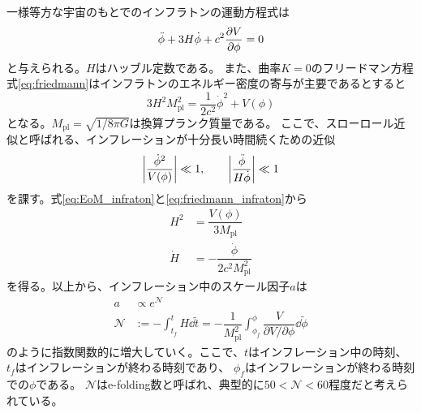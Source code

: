 \documentclass[../../main.tex]{subfiles}
\begin{document}
一様等方な宇宙のもとでのインフラトンの運動方程式は
\begin{equation}
    \label{eq:EoM_infraton}
    \ddot{\phi}+3H\dot{\phi}+c^2\pdv{V}{\phi} = 0
\end{equation}
と与えられる。$H$はハッブル定数である。
また、曲率$K=0$のフリードマン方程式\eqref{eq:friedmann}はインフラトンのエネルギー密度の寄与が主要であるとすると
\begin{equation}
    \label{eq:friedmann_infraton}
    3H^2M_{\mathrm{pl}}^2 = \dfrac{1}{2c^2}\dot{\phi}^2 +V(\phi)
\end{equation}
となる。$M_{\mathrm{pl}}=\sqrt{1/8\pi G}$は換算プランク質量である。
ここで、スローロール近似と呼ばれる、インフレーションが十分長い時間続くための近似
\begin{align}
    \qty|\dfrac{\dot{\phi}^2}{V(\phi)}| \ll 1,\qquad \qty|\dfrac{\ddot{\phi}}{H\dot{\phi}}| \ll 1
\end{align}
を課す。式\eqref{eq:EoM_infraton}と\eqref{eq:friedmann_infraton}から
\begin{align}
    H^2 &= \dfrac{V(\phi)}{3M_{\mathrm{pl}}} \\
    \dot{H} &= -\dfrac{\dot{\phi}}{2c^2M_{\mathrm{pl}}^2}
\end{align}
を得る。以上から、インフレーション中のスケール因子$a$は
\begin{align}
    a&\propto e^{\mathcal{N}} \\
    \mathcal{N} &:= -\int_{t_f}^{t}H\dd{\tilde{t}} = -\dfrac{1}{M_{\mathrm{pl}}^2}\int_{\phi_f}^{\phi}\dfrac{V}{\partial V/\partial \phi}\dd{\tilde{\phi}}
\end{align}
のように指数関数的に増大していく。ここで、$t$はインフレーション中の時刻、$t_f$はインフレーションが終わる時刻であり、
$\phi_f$はインフレーションが終わる時刻での$\phi$である。
$\mathcal{N}$はe-folding数と呼ばれ、典型的に$50<\mathcal{N}<60$程度だと考えられている。
\end{document}
